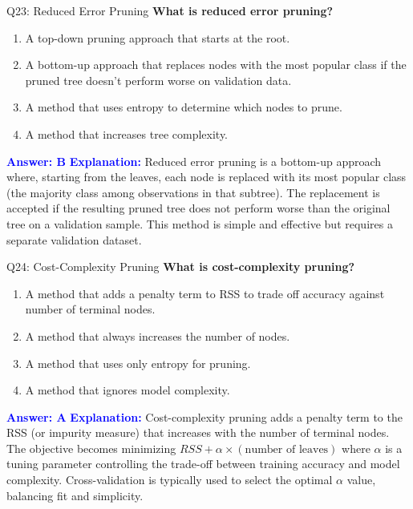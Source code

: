 \documentclass[8pt]{beamer}
\begin{document}
	\begin{frame}{Q23: Reduced Error Pruning}
		\fontsize{6.5}{7.5}\selectfont
		\textbf{What is reduced error pruning?}
		\begin{enumerate}
			\item A top-down pruning approach that starts at the root.
			\item A bottom-up approach that replaces nodes with the most popular class if the pruned tree doesn't perform worse on validation data.
			\item A method that uses entropy to determine which nodes to prune.
			\item A method that increases tree complexity.
		\end{enumerate}
		\vspace{0.1cm}
		\textcolor{blue}{\textbf{Answer: B}}
		\vspace{0.1cm}
		\textcolor{blue}{\textbf{Explanation:}} Reduced error pruning is a bottom-up approach where, starting from the leaves, each node is replaced with its most popular class (the majority class among observations in that subtree). The replacement is accepted if the resulting pruned tree does not perform worse than the original tree on a validation sample. This method is simple and effective but requires a separate validation dataset.
	\end{frame}
	
	\begin{frame}{Q24: Cost-Complexity Pruning}
		\fontsize{6.5}{7.5}\selectfont
		\textbf{What is cost-complexity pruning?}
		\begin{enumerate}
			\item A method that adds a penalty term to RSS to trade off accuracy against number of terminal nodes.
			\item A method that always increases the number of nodes.
			\item A method that uses only entropy for pruning.
			\item A method that ignores model complexity.
		\end{enumerate}
		\vspace{0.1cm}
		\textcolor{blue}{\textbf{Answer: A}}
		\vspace{0.1cm}
		\textcolor{blue}{\textbf{Explanation:}} Cost-complexity pruning adds a penalty term to the RSS (or impurity measure) that increases with the number of terminal nodes. The objective becomes minimizing $RSS + \alpha \times (\text{number of leaves})$ where $\alpha$ is a tuning parameter controlling the trade-off between training accuracy and model complexity. Cross-validation is typically used to select the optimal $\alpha$ value, balancing fit and simplicity.
	\end{frame}
	
\end{document}
